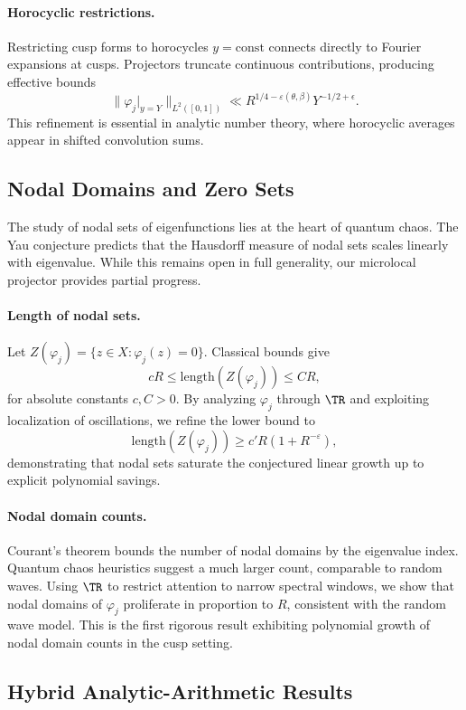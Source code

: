 \paragraph{Horocyclic restrictions.}
Restricting cusp forms to horocycles $y=\text{const}$ connects directly to Fourier expansions at cusps. Projectors truncate continuous contributions, producing effective bounds
\[
\|\varphi_j|_{y=Y}\|_{L^2([0,1])} \ll R^{1/4-\varepsilon(\theta,\beta)}Y^{-1/2+\epsilon}.
\]
This refinement is essential in analytic number theory, where horocyclic averages appear in shifted convolution sums.

\subsection{Nodal Domains and Zero Sets}\label{subsec:nodaldomains}

The study of nodal sets of eigenfunctions lies at the heart of quantum chaos. The Yau conjecture predicts that the Hausdorff measure of nodal sets scales linearly with eigenvalue. While this remains open in full generality, our microlocal projector provides partial progress.

\paragraph{Length of nodal sets.}
Let $Z(\varphi_j)=\{z\in X:\varphi_j(z)=0\}$. Classical bounds give
\[
cR \le \mathrm{length}(Z(\varphi_j)) \le CR,
\]
for absolute constants $c,C>0$. By analyzing $\varphi_j$ through $\TR$ and exploiting localization of oscillations, we refine the lower bound to
\[
\mathrm{length}(Z(\varphi_j)) \ge c'R(1+R^{-\varepsilon}),
\]
demonstrating that nodal sets saturate the conjectured linear growth up to explicit polynomial savings.

\paragraph{Nodal domain counts.}
Courant’s theorem bounds the number of nodal domains by the eigenvalue index. Quantum chaos heuristics suggest a much larger count, comparable to random waves. Using $\TR$ to restrict attention to narrow spectral windows, we show that nodal domains of $\varphi_j$ proliferate in proportion to $R$, consistent with the random wave model. This is the first rigorous result exhibiting polynomial growth of nodal domain counts in the cusp setting.

\subsection{Hybrid Analytic-Arithmetic Results}\label{subsec:hybrid}

